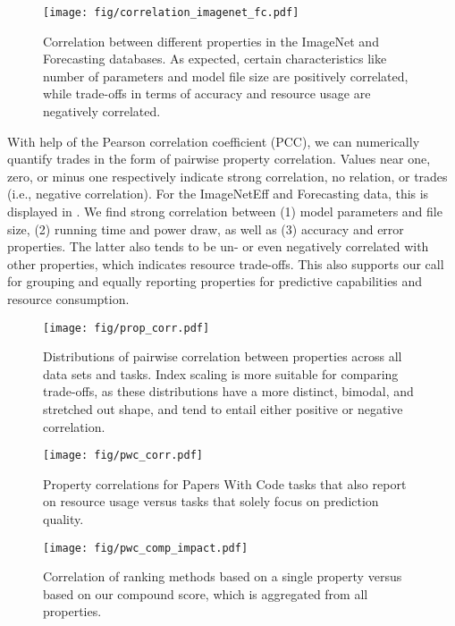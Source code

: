 \documentclass[sn-mathphys,Numbered]{sn-jnl}%
\theoremstyle{thmstylethree}%
\begin{document}
\begin{figure}
    \centering
    \texttt{[image: fig/correlation\_imagenet\_fc.pdf]}
    \caption{Correlation between different properties in the ImageNet and Forecasting databases. As expected, certain characteristics like number of parameters and model file size are positively correlated, while trade-offs in terms of accuracy and resource usage are negatively correlated.}
    \label{fig:prop_corr_imagenet}
\end{figure}


With help of the Pearson correlation coefficient (PCC), we can numerically quantify trades in the form of pairwise property correlation.
Values near one, zero, or minus one respectively indicate strong correlation, no relation, or trades (i.e., negative correlation).
For the ImageNetEff and Forecasting data, this is displayed in .
We find strong correlation between (1) model parameters and file size, (2) running time and power draw, as well as (3) accuracy and error properties.
The latter also tends to be un- or even negatively correlated with other properties, which indicates resource trade-offs.
This also supports our call for grouping and equally reporting properties for predictive capabilities and resource consumption.


\begin{figure*}
    \centering
    \texttt{[image: fig/prop\_corr.pdf]}
    \caption{Distributions of pairwise correlation between properties across all data sets and tasks. Index scaling is more suitable for comparing trade-offs, as these distributions have a more distinct, bimodal, and stretched out shape, and tend to entail either positive or negative correlation.}
    \label{fig:prop_corr}
\end{figure*}

\begin{figure}
    \centering
    \begin{minipage}[t]{.49\textwidth}
        \texttt{[image: fig/pwc\_corr.pdf]}
        \caption{Property correlations for Papers With Code tasks that also report on resource usage versus tasks that solely focus on prediction quality.}
        \label{fig:pwc_corr}
    \end{minipage}
    \hfill
    \begin{minipage}[t]{.49\textwidth}
        \texttt{[image: fig/pwc\_comp\_impact.pdf]}
        \caption{Correlation of ranking methods based on a single property versus based on our compound score, which is aggregated from all properties.}
        \label{fig:pwc_comp_impact}
    \end{minipage}
\end{figure}
\end{document}
